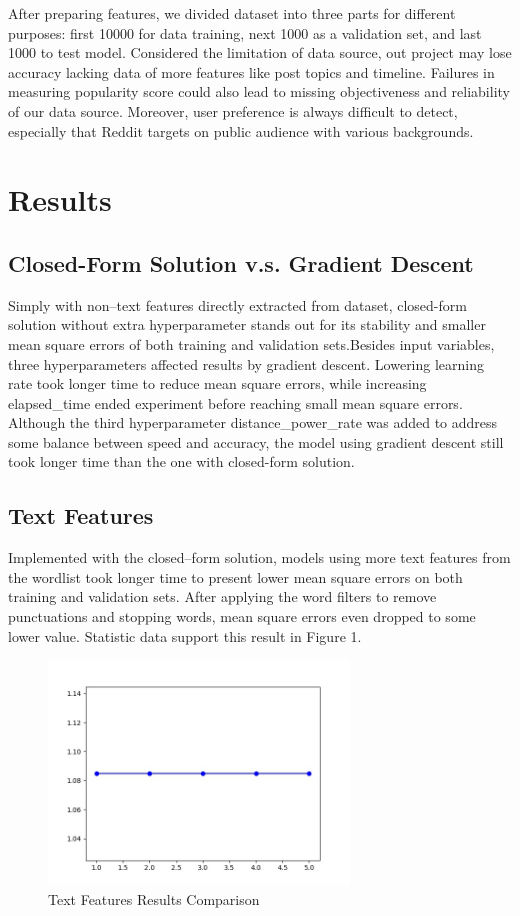 \documentclass[12pt]{article}
\begin{document}
After preparing features, we divided dataset into three parts for different purposes: first 10000 for data training, next 1000 as a validation set, and last 1000 to test model. Considered the limitation of data source, out project may lose accuracy lacking data of more features like post topics and timeline. Failures in measuring popularity score could also lead to missing objectiveness and reliability of our data source. Moreover, user preference is always difficult to detect, especially that Reddit targets on public audience with various backgrounds.

\section*{Results}


\subsection*{Closed-Form Solution v.s. Gradient Descent}
Simply with non\---text features directly extracted from dataset, closed-form solution without extra hyperparameter stands out for its stability and smaller mean square errors of both training and validation sets.Besides input variables, three hyperparameters affected results by gradient descent. Lowering learning rate took longer time to reduce mean square errors, while increasing elapsed\_time ended experiment before reaching small mean square errors. Although the third hyperparameter distance\_power\_rate was added to address some balance between speed and accuracy, the model using gradient descent still took longer time than the one with closed-form solution.

\subsection*{Text Features}
Implemented with the closed\---form solution, models using more text features from the wordlist took longer time to present lower mean square errors on both training and validation sets. After applying the word filters to remove punctuations and stopping words, mean square errors even dropped to some lower value. Statistic data support this result in Figure 1.

\begin{figure}[h]
\centering
\includegraphics[width=8cm]{pic1.jpg}
\caption{Text Features Results Comparison}
\label{fig: fig1}
\end{figure}
\end{document}
